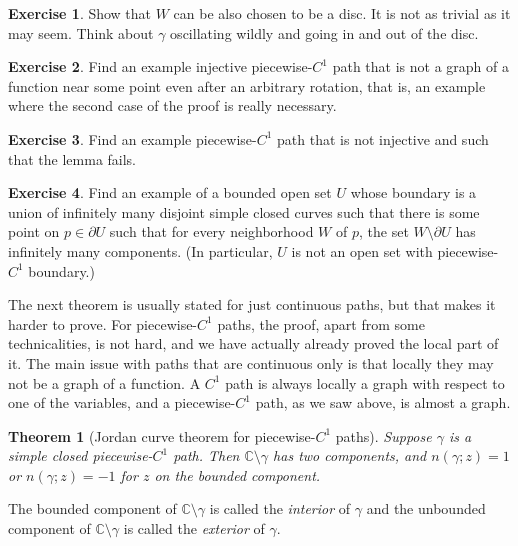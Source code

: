 \documentclass[12pt,openany]{book}
\newcommand{\C}{{\mathbb{C}}}
\theoremstyle{plain}
\newtheorem{thm}{Theorem}[section]
\theoremstyle{remark}
\theoremstyle{definition}
\newenvironment{exbox}{%
    \def\FrameCommand{\vrule width 1pt \relax\hspace{10pt}}%
    \MakeFramed{\advance\hsize-\width\FrameRestore}%
}{%
    \endMakeFramed
}
\theoremstyle{exercise}
\newtheorem{exercise}{Exercise}[section]
\theoremstyle{example}
\begin{document}
\begin{exbox}
\begin{exercise}
Show that $W$ can be also chosen to be a disc.
It is not as trivial as it may seem.
Think about $\gamma$ oscillating wildly and going in and out of the disc.
\end{exercise}

\begin{exercise}
Find an example injective piecewise-$C^1$ path that is not a graph of a
function near some point even after an arbitrary rotation,
that is, an example where the second case of the
proof is really necessary.
\end{exercise}

\begin{exercise}
Find an example piecewise-$C^1$ path that is not injective and such that
the lemma fails.
\end{exercise}

\begin{exercise}
Find an example of a bounded open set $U$ whose boundary is a union of
infinitely many disjoint simple closed curves such that there is some point
on $p \in \partial U$ such that for every neighborhood $W$ of $p$,
the set $W \setminus \partial U$ has infinitely many components.
(In particular, $U$ is not an open set with piecewise-$C^1$ boundary.)
\end{exercise}
\end{exbox}

The next theorem is usually stated for just continuous paths, but that makes
it harder to prove.  For piecewise-$C^1$ paths, the proof, apart from some
technicalities, is not hard, and we have actually already proved the
local part of it.  The main issue with paths that are continuous only is that
locally they may not be a graph of a function.  A $C^1$ path is always
locally a graph with respect to one of the variables, and a piecewise-$C^1$
path, as we saw above, is almost a graph.

\begin{thm}[Jordan curve theorem for piecewise-$C^1$ paths]%
Suppose $\gamma$ is a simple closed piecewise-$C^1$ path.
Then $\C \setminus \gamma$ has two components,
and $n(\gamma;z) = 1$ or 
$n(\gamma;z) = -1$ for $z$ on the bounded component.
\end{thm}

The bounded component of $\C \setminus \gamma$ is called the
\emph{interior} of $\gamma$
and the unbounded component of $\C \setminus \gamma$ is called the
\emph{exterior} of $\gamma$.
\end{document}
